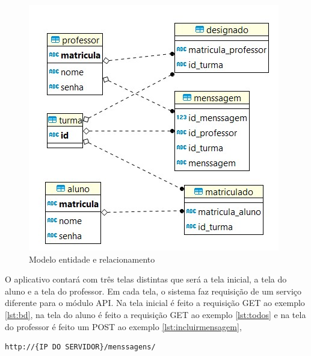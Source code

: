 \begin{figure}[H]
\centering
\includegraphics[scale=0.8]{figuras/entidaderelacionamentomobile}
\caption{Modelo entidade e relacionamento}
\label{fig:entidaderelacionamentomobile}
\end{figure}

O aplicativo contará com três telas distintas que será a tela inicial, a tela do aluno e a tela do professor. Em cada tela, o sistema faz requisição de um serviço diferente para o módulo API. Na tela inicial é feito a requisição GET ao exemplo \ref{lst:bd}, na tela do aluno é feito a requisição GET ao exemplo \ref{lst:todos} e na tela do professor é feito um POST ao exemplo \ref{lst:incluirmensagem},

\begin{lstlisting}[caption={Incluir novas mensagens},label={lst:incluirmensagem}]
	http://{IP DO SERVIDOR}/menssagens/
\end{lstlisting}

